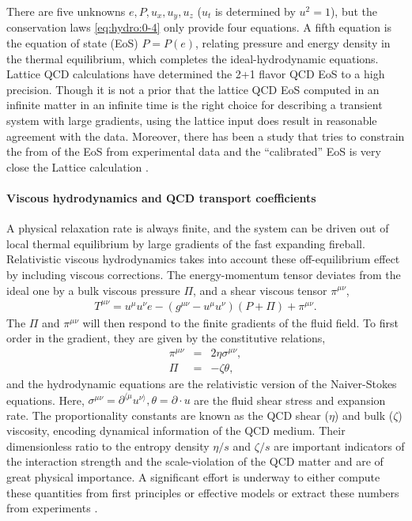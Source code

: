 There are five unknowns $e, P, u_x, u_y, u_z$ ($u_t$ is determined by $u^2 = 1$), but the conservation laws \ref{eq:hydro:0-4} only provide four equations.
A fifth equation is the equation of state (EoS) $P = P(e)$, relating pressure and energy density in the thermal equilibrium, which completes the ideal-hydrodynamic equations.
Lattice QCD calculations have determined the 2+1 flavor QCD EoS to a high precision.
Though it is not a prior that the lattice QCD EoS computed in an infinite matter in an infinite time is the right choice for describing a transient system with large gradients, using the lattice input does result in reasonable agreement with the data.
Moreover, there has been a study that tries to constrain the from of the EoS from experimental data and the ``calibrated'' EoS is very close the Lattice calculation \cite{Pratt:2015zsa}.

\paragraph{Viscous hydrodynamics and QCD transport coefficients}
A physical relaxation rate is always finite, and the system can be driven out of local thermal equilibrium by large gradients of the fast expanding fireball.
Relativistic viscous hydrodynamics takes into account these off-equilibrium effect by including viscous corrections.
The energy-momentum tensor deviates from the ideal one by a bulk viscous pressure $\Pi$, and a shear viscous tensor $\pi^{\mu\nu}$,
\begin{eqnarray}
T^{\mu\nu} = u^\mu u^\nu e - (g^{\mu\nu}- u^\mu u^\nu) (P+\Pi) + \pi^{\mu\nu}.
\end{eqnarray}
The $\Pi$ and $\pi^{\mu\nu}$ will then respond to the finite gradients of the fluid field.
To first order in the gradient, they are given by the constitutive relations,
\begin{eqnarray}
\pi^{\mu\nu} &=& 2\eta\sigma^{\mu\nu},\\
\Pi &=& -\zeta\theta,
\end{eqnarray}
and the hydrodynamic equations are the relativistic version of the Naiver-Stokes equations.
Here, $\sigma^{\mu\nu} = \partial^{\langle \mu} u^{\nu\rangle}, \theta = \partial\cdot u$ are the fluid shear stress and expansion rate.
The proportionality constants are known as the QCD shear ($\eta$) and bulk ($\zeta$) viscosity, encoding dynamical information of the QCD medium. 
Their dimensionless ratio to the entropy density $\eta/s$ and $\zeta/s$ are important indicators of the interaction strength and the scale-violation of the QCD matter and are of great physical importance.
A significant effort is underway to either compute these quantities from first principles or effective models or extract these numbers from experiments \cite{Bernhard:2015hxa,Bernhard:2016tnd,Auvinen:2017fjw,Bernhard:2018hnz,Novak:2013bqa}.

